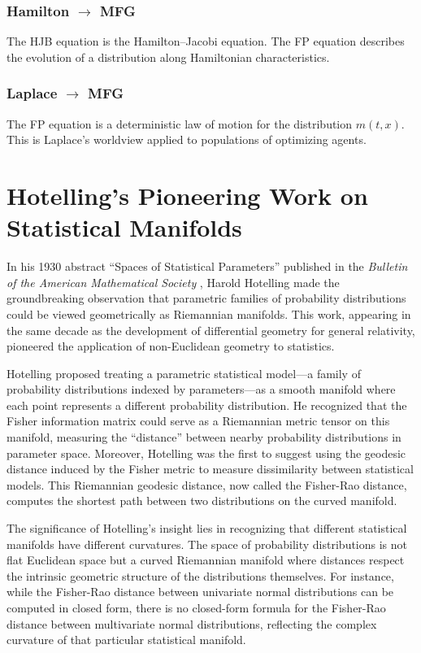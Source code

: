 \documentclass[12pt]{article}
\begin{document}
\subsubsection{Hamilton $\to$ MFG}

The HJB equation is the Hamilton--Jacobi equation. The FP equation describes the evolution of a distribution along Hamiltonian characteristics.

\subsubsection{Laplace $\to$ MFG}

The FP equation is a deterministic law of motion for the distribution $m(t, x)$. This is Laplace's worldview applied to populations of optimizing agents.


\section{Hotelling's Pioneering Work on Statistical Manifolds}

In his 1930 abstract ``Spaces of Statistical Parameters'' published in the \emph{Bulletin of the American Mathematical Society} \cite{Hotelling1930}, Harold Hotelling made the groundbreaking observation that parametric families of probability distributions could be viewed geometrically as Riemannian manifolds. This work, appearing in the same decade as the development of differential geometry for general relativity, pioneered the application of non-Euclidean geometry to statistics.

Hotelling proposed treating a parametric statistical model---a family of probability distributions indexed by parameters---as a smooth manifold where each point represents a different probability distribution. He recognized that the Fisher information matrix could serve as a Riemannian metric tensor on this manifold, measuring the ``distance'' between nearby probability distributions in parameter space. Moreover, Hotelling was the first to suggest using the geodesic distance induced by the Fisher metric to measure dissimilarity between statistical models. This Riemannian geodesic distance, now called the Fisher-Rao distance, computes the shortest path between two distributions on the curved manifold.

The significance of Hotelling's insight lies in recognizing that different statistical manifolds have different curvatures. The space of probability distributions is not flat Euclidean space but a curved Riemannian manifold where distances respect the intrinsic geometric structure of the distributions themselves. For instance, while the Fisher-Rao distance between univariate normal distributions can be computed in closed form, there is no closed-form formula for the Fisher-Rao distance between multivariate normal distributions, reflecting the complex curvature of that particular statistical manifold.
\end{document}
